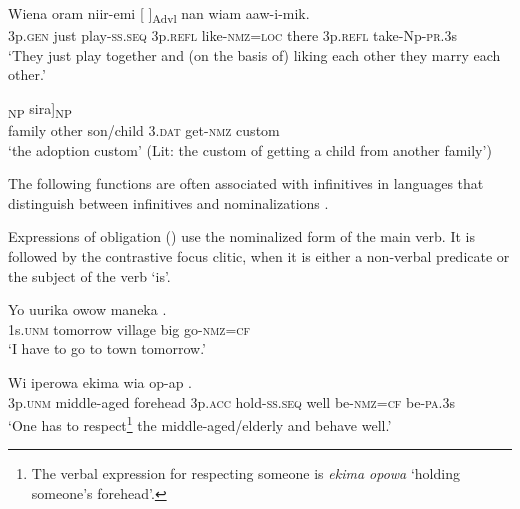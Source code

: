 \ea%
\label{ex:5:x1241}
\gll Wiena  oram  niir-emi  [ \textstyleEmphasizedVernacularWords{-}]\textsubscript{Advl} nan  wiam  aaw-i-mik. \\
     3p.\textsc{gen}  just  play-\textsc{ss}.\textsc{seq}  3p.\textsc{refl}  like-\textsc{nmz}=\textsc{loc} there  3p.\textsc{refl}  take-Np-\textsc{pr}.3s \\
\glt `They just play together and (on the basis of) liking each other they marry each other.'
\z

\ea%
\label{ex:5:x1229}
\gll [[\textstyleEmphasizedVernacularWords{garanga}  \textstyleEmphasizedVernacularWords{oko} \textstyleEmphasizedVernacularWords{muuka} \textstyleEmphasizedVernacularWords{wiar} \textstyleEmphasizedVernacularWords{aaw-owa}]\textsubscript{NP}  sira]\textsubscript{NP} \\
     family  other  son/child  3.\textsc{dat}  get-\textsc{nmz}  custom \\
\glt `the adoption custom' (Lit: the custom of getting a child from another family')
\z

The following functions are often associated with infinitives in languages that distinguish between infinitives and nominalizations \citep[207]{Ylikoski2003}. 

Expressions of obligation () use the nominalized form of the main verb. It is followed by the contrastive focus clitic, when it is either a non-verbal predicate  or the subject of the verb  `is'.

\ea%
\label{ex:5:x1242}
\gll Yo  uurika  owow  maneka  . \\
     1s.\textsc{unm}  tomorrow  village  big  go-\textsc{nmz}=\textsc{cf} \\
\glt `I have to go to town tomorrow.'
\z

\ea%
\label{ex:5:x1243}
\gll Wi  iperowa  ekima  wia  op-ap    . \\
     3p.\textsc{unm}  middle-aged  forehead  3p.\textsc{acc}  hold-\textsc{ss}.\textsc{seq}  well be-\textsc{nmz}=\textsc{cf}  be-\textsc{pa}.3s \\
\glt `One has to respect\footnote{The verbal expression for respecting someone is \textit{ekima opowa} `holding someone's forehead'.} the middle-aged/elderly and behave well.'
\z

